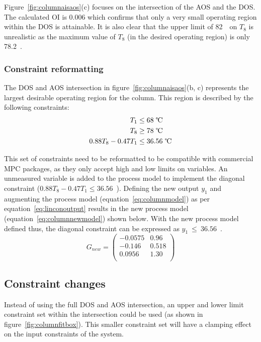 \documentclass[final,authoryear,5pt,times,twocolumn]{elsarticle}
\newcommand{\bpm}{\begin{pmatrix}} %
\newcommand{\epm}{\end{pmatrix}}
\begin{document}
Figure~\ref{fig:columnaisaos}(c) focuses on the intersection of the AOS and the DOS.
The calculated OI is 0.006 which confirms that only a very small operating region within the DOS is attainable.
It is also clear that the upper limit of 82~\textcelsius\ on $T_8$ is unrealistic as the maximum value of $T_8$ (in the desired operating region) is only 78.2~\textcelsius.

\subsubsection{Constraint reformatting}
The DOS and AOS intersection in figure~\ref{fig:columnaisaos}(b, c) represents the largest desirable operating region for the column.
This region is described by the following constraints:
\begin{align*}
  T_1 &\leq 68\text{~\textcelsius} \\
  T_8 &\geq 78\text{~\textcelsius} \\
  0.88T_8-0.47T_1&\leq 36.56\text{~\textcelsius}
\end{align*}

This set of constraints need to be reformatted to be compatible with commercial MPC packages, as they only accept high and low limits on variables.
An unmeasured variable is added to the process model to implement the diagonal constraint ($0.88T_8-0.47T_1\leq 36.56$~\textcelsius).
Defining the new output $y_1$ and augmenting the process model (equation~\ref{eq:columnmodel}) as per equation~\ref{eq:linconoutput} results in the new process model (equation~\ref{eq:columnnewmodel}) shown below. With the new process model defined thus, the diagonal constraint can be expressed as {$y_1~\leq~36.56$~\textcelsius}.
\begin{equation}
  \label{eq:columnnewmodel}
  G_{new}= \bpm -0.0575 & 0.96 \\       %
                  -0.146  & 0.518 \\      %
                   0.0956 & 1.30 \\ \epm  %
\end{equation}


\subsection{Constraint changes}
Instead of using the full DOS and AOS intersection, an upper and lower limit constraint set within the intersection could be used (as shown in figure~\ref{fig:columnfitbox}).
This smaller constraint set will have a clamping effect on the input constraints of the system.
\end{document}
